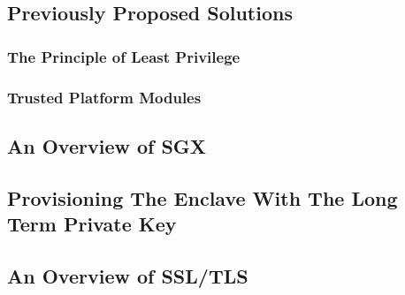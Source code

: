 \documentclass[../main.tex]{subfiles}
\begin{document}
\subsection{Previously Proposed Solutions}

\subsubsection{The Principle of Least Privilege}


\subsubsection{Trusted Platform Modules}


\subsection{An Overview of SGX}


\subsection{Provisioning The Enclave With The Long Term Private Key}


\subsection{An Overview of SSL/TLS}

\end{document}
